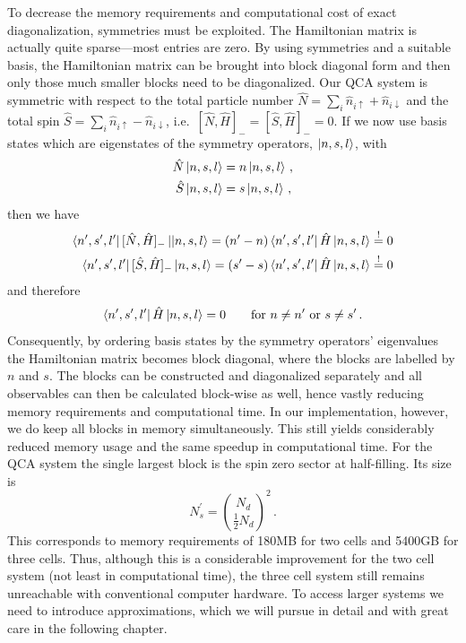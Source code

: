 %
To decrease the memory requirements and computational cost of
exact diagonalization, symmetries must be exploited. The Hamiltonian matrix is
actually quite sparse---most entries are zero. By using symmetries and a
suitable basis, the Hamiltonian matrix can be brought into block diagonal form
and then only those much smaller blocks need to be diagonalized. Our QCA system
is symmetric with respect to the total particle number $\hat{N} = \sum_i
\hat{n}_{i\uparrow} + \hat{n}_{i\downarrow}$ and the total spin $\hat{S} =
\sum_i \hat{n}_{i\uparrow} - \hat{n}_{i\downarrow}$, i.e.\ $[\hat{N},\hat{H}]_-
= [\hat{S},\hat{H}]_- = 0$. If we now use basis states which are eigenstates of
the symmetry operators, $\left|n,s,l\right>$, with
%
\begin{equation}
\begin{split}
  \hat{N} \left|n,s,l\right> &= n \left|n,s,l\right> \, , \\
  \hat{S} \left|n,s,l\right> &= s \left|n,s,l\right> \, ,
\end{split}
\end{equation}
%
then we have
%
\begin{equation}
\begin{split}
  \left<n^{\prime},s^{\prime},l^{\prime}\right| [\hat{N},\hat{H}]_- \left||n,s,l\right> = 
  (n^{\prime} - n) \left<n^{\prime},s^{\prime},l^{\prime}\right| \hat{H} \left|n,s,l\right>
  \stackrel{!}{=} 0 \\
  \left<n^{\prime},s^{\prime},l^{\prime}\right| [\hat{S},\hat{H}]_- \left|n,s,l\right> = 
  (s^{\prime} - s) \left<n^{\prime},s^{\prime},l^{\prime}\right| \hat{H} \left|n,s,l\right>
  \stackrel{!}{=} 0
\end{split}
\end{equation}
%
and therefore
%
\begin{equation}
  \left<n^{\prime},s^{\prime},l^{\prime}\right| \hat{H} \left|n,s,l\right> = 0 \qquad
  \textrm{for } n \ne n^{\prime} \textrm{ or } s \ne s^{\prime} \, .
\end{equation}
%
Consequently, by ordering basis states by the symmetry operators' eigenvalues
the Hamiltonian matrix becomes block diagonal, where the blocks are labelled by
$n$ and $s$. The blocks can be constructed and diagonalized separately and all
observables can then be calculated block-wise as well, hence vastly reducing
memory requirements and computational time. In our implementation, however, we
do keep all blocks in memory simultaneously. This still yields considerably
reduced memory usage and the same speedup in computational time. For the QCA system
the single largest block is the spin zero sector at half-filling. Its size is
%
\begin{equation}
  N_s^{\prime} = \binom{N_d}{\frac{1}{2} N_d}^2 \, .
\end{equation}
%
This corresponds to memory requirements of 180MB for two cells and 5400GB for
three cells. Thus, although this is a considerable improvement for the two cell
system (not least in computational time), the three cell system still remains
unreachable with conventional computer hardware. To access larger systems we
need to introduce approximations, which we will pursue in detail and with great
care in the following chapter.

